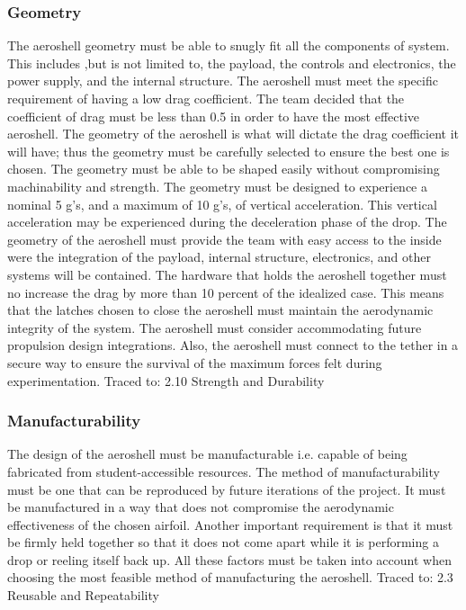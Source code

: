\subsubsection*{Geometry}
\indent\indent The aeroshell geometry must be able to snugly fit all the components of system. This includes ,but is not limited to, the payload, the controls and electronics, the power supply, and the internal structure. The aeroshell must meet the specific requirement of having a low drag coefficient. The team decided that the coefficient of drag must be less than 0.5 in order to have the most effective aeroshell. The geometry of the aeroshell is what will dictate the drag coefficient it will have; thus the geometry must be carefully selected to ensure the best one is chosen. The geometry must be able to be shaped easily without compromising machinability and strength. The geometry must be designed to experience a nominal 5 g’s, and a maximum of 10 g’s, of vertical acceleration. This vertical acceleration may be experienced during the deceleration phase of the drop. The geometry of the aeroshell must provide the team with easy access to the inside were the integration of the payload, internal structure, electronics, and other systems will be contained. The hardware that holds the aeroshell together must no increase the drag by more than 10 percent of the idealized case. This means that the latches chosen to close the aeroshell must maintain the aerodynamic integrity of the system. The aeroshell must consider accommodating future propulsion design integrations. Also, the aeroshell must connect to the tether in a secure way to ensure the survival of the maximum forces felt during experimentation. Traced to: 2.10 Strength and Durability


\subsubsection*{Manufacturability}
\indent\indent The design of the aeroshell must be manufacturable i.e. capable of being fabricated from student-accessible resources. The method of manufacturability must be one that can be reproduced by future iterations of the project. It must be manufactured in a way that does not compromise the aerodynamic effectiveness of the chosen airfoil. Another important requirement is that it must be firmly held together so that it does not come apart while it is performing a drop or reeling itself back up. All these factors must be taken into account when choosing the most feasible method of manufacturing the aeroshell. Traced to: 2.3 Reusable and Repeatability

